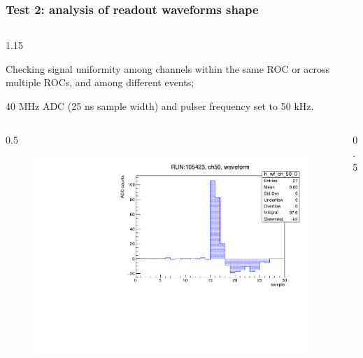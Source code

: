 \documentclass{beamer}
\begin{document}
\begin{frame}
    \frametitle{Test 2: analysis of readout waveforms shape}
    \vspace{-4mm}
    \begin{columns}
\begin{column}{1.15\framewidth}
    \setlength{\leftmargini}{1.2em}
 \begin{itemize}
 {\small
  \item Checking signal uniformity among channels within the same ROC or across multiple ROCs, and among different events;
  \item 40 MHz ADC (25 ns sample width) and pulser frequency set to 50 kHz.}
  \end{itemize}
    \end{column}
    \end{columns}
    \vspace{0mm}
    \begin{columns}
\begin{column}{0.5\framewidth}
         \begin{figure}[!h]
      \centering
      \hspace*{-2em}
      \includegraphics[width=1.\columnwidth]{figures/pdf/wf_ch50_0.pdf}
     \label{fig:normalhits}
\end{figure}
\end{column}
\begin{column}{0.5\framewidth}

\end{column}
\end{columns}
\end{frame}
\end{document}
